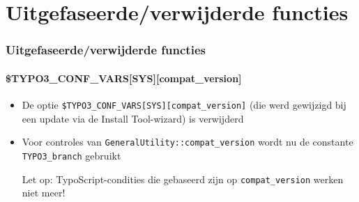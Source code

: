 %

\section{Uitgefaseerde/verwijderde functies}


\begin{frame}[fragile]
	\frametitle{Uitgefaseerde/verwijderde functies}
	\framesubtitle{\$TYPO3\_CONF\_VARS[SYS][compat\_version]}

	\begin{itemize}

		\item De optie \texttt{\$TYPO3\_CONF\_VARS[SYS][compat\_version]} (die werd 
			gewijzigd bij een update via de Install Tool-wizard) is verwijderd

		\item Voor controles van \texttt{GeneralUtility::compat\_version} wordt nu 
			de constante \texttt{TYPO3\_branch} gebruikt

			\vspace{0.2cm}

			\begingroup
				\color{red}
					Let op: TypoScript-condities die gebaseerd zijn op \texttt{compat\_version} 
						werken niet meer!
			\endgroup

	\end{itemize}

\end{frame}


